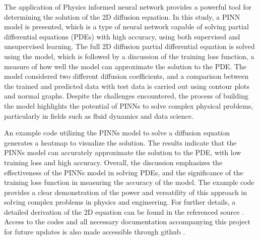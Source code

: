 The application of Physics informed neural network provides a powerful tool for determining the solution of the 2D diffusion equation. In this study, a PINN model is presented, which is a type of neural network capable of solving partial differential equations (PDEs) with high accuracy, using both supervised and unsupervised learning. The full 2D diffusion partial differential equation is solved using the model, which is followed by a discussion of the training loss function, a measure of how well the model can approximate the solution to the PDE. The model considered two different diffusion coefficients, and a comparison between the trained and predicted data with test data is carried out using contour plots and normal graphs. Despite the challenges encountered, the process of building the model highlights the potential of PINNs to solve complex physical problems, particularly in fields such as fluid dynamics and data science.

An example code utilizing the PINNs model to solve a diffusion equation generates a heatmap to visualize the solution. The results indicate that the PINNs model can accurately approximate the solution to the PDE, with low training loss and high accuracy. Overall, the discussion emphasizes the effectiveness of the PINNs model in solving PDEs, and the significance of the training loss function in measuring the accuracy of the model. The example code provides a clear demonstration of the power and versatility of this approach in solving complex problems in physics and engineering. For further details, a detailed derivation of the 2D equation can be found in the referenced source \cite{Eyob2023}. Access to the codes and all necessary documentation accompanying this project for future updates is also made accessible through github \cite{Eyob2023_Git}.